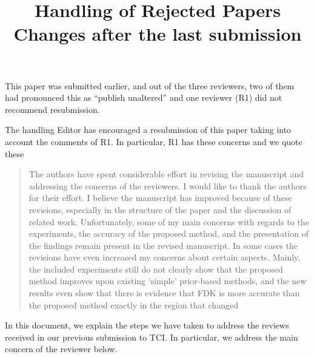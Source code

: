\documentclass{article}
\title{Handling of Rejected Papers
Changes after the last submission}
\begin{document}
\date{}
\maketitle

This paper was submitted earlier, and out of the three reviewers, two of them had pronounced this as ``publish unaltered'' and one reviewer (R1) did not recommend resubmission.

The handling Editor has encouraged a resubmission of this paper taking into account the comments of R1.  In particular, R1 has these concerns and we quote these
\begin{quote}
  The authors have spent considerable effort in revising the
  manuscript and addressing the concerns of the reviewers. I would
  like to thank the authors for their effort. I believe the manuscript
  has improved because of these revisions, especially in the structure
  of the paper and the discussion of related work. Unfortunately, some
  of my main concerns with regards to the experiments, the accuracy of
  the proposed method, and the presentation of the findings remain
  present in the revised manuscript. In some cases the revisions have
  even increased my concerns about certain aspects. Mainly, the
  included experiments still do not clearly show that the proposed
  method improves upon existing ‘simple’ prior-based methods, and the
  new results even show that there is evidence that FDK is more
  accurate than the proposed method exactly in the region that changed
  \end{quote}

In this document, we explain the steps we have taken to address the
reviews received in our previous submission to TCI. In particular,
we address the main concern of the reviewer below.
\end{document}
